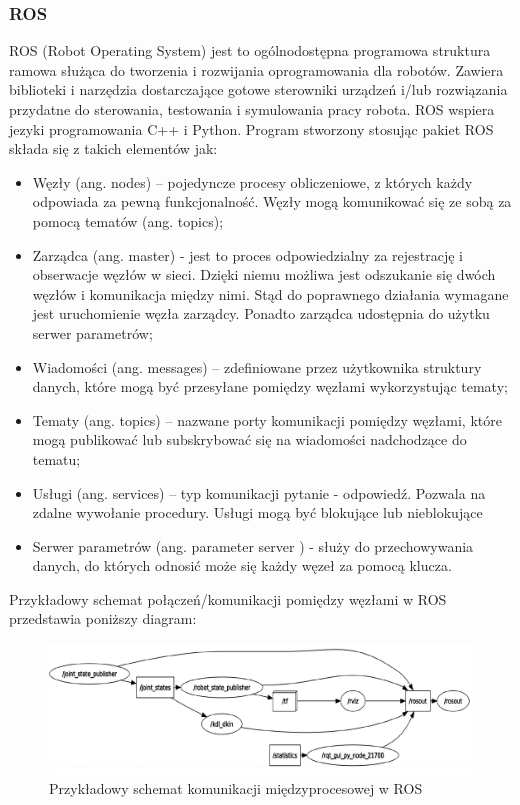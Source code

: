 \documentclass[a4paper, 12pt, twoside]{article}
\begin{document}
\subsubsection{ROS}

ROS (Robot Operating System) \cite{rosdesc} jest to ogólnodostępna programowa struktura ramowa służąca
do tworzenia i rozwijania oprogramowania dla robotów. Zawiera biblioteki i narzędzia dostarczające gotowe sterowniki urządzeń i/lub rozwiązania przydatne do sterowania, testowania i symulowania pracy robota. ROS wspiera jezyki programowania C++ i Python. Program stworzony stosując pakiet ROS składa się z takich elementów jak:
\begin{itemize}
\item Węzły (ang. nodes) – pojedyncze procesy obliczeniowe, z których każdy odpowiada za pewną funkcjonalność. Węzły mogą komunikować się ze sobą za pomocą tematów (ang. topics);
\item Zarządca (ang. master) - jest to proces odpowiedzialny za rejestrację i obserwacje węzłów w sieci. Dzięki niemu możliwa jest odszukanie się dwóch węzłów i komunikacja między nimi. Stąd do poprawnego działania wymagane jest uruchomienie węzła zarządcy. Ponadto zarządca udostępnia do użytku serwer parametrów;
\item Wiadomości (ang. messages) – zdefiniowane przez użytkownika struktury danych, które mogą być przesyłane pomiędzy węzłami wykorzystując tematy;
\item Tematy (ang. topics) – nazwane porty komunikacji pomiędzy węzłami, które mogą publikować lub subskrybować się na wiadomości nadchodzące do tematu;
\item Usługi (ang. services) – typ komunikacji pytanie - odpowiedź. Pozwala na zdalne wywołanie procedury. Usługi mogą być blokujące lub nieblokujące
\item Serwer parametrów (ang. parameter server ) - służy do przechowywania danych, do których odnosić może się każdy węzeł za pomocą klucza.
\end{itemize}

Przykładowy schemat połączeń/komunikacji pomiędzy węzłami w ROS przedstawia poniższy diagram:

\begin{figure}[H]
\centering
\includegraphics[width=0.8\linewidth]{images/ros_nodes.png}
\caption{Przykładowy schemat komunikacji międzyprocesowej w ROS}
\label{fig:ros_nodes}
\end{figure}
\end{document}
